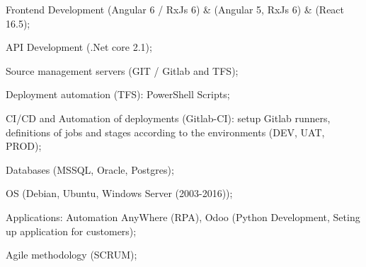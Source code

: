 \begin{cventries}
{      \begin{cvitems}
        \item {Frontend Development (Angular 6 / RxJs 6) \& (Angular 5, RxJs 6) \& (React 16.5);}
        \item {API Development (.Net core 2.1);}
        \item {Source management servers (GIT / Gitlab and TFS);}
        \item {Deployment automation (TFS): PowerShell Scripts;}
        \item {CI/CD and Automation of deployments (Gitlab-CI): setup Gitlab runners, definitions of jobs and stages according to the environments (DEV, UAT, PROD);}
        \item {Databases (MSSQL, Oracle, Postgres);}
        \item {OS (Debian, Ubuntu, Windows Server (2003-2016));}
        \item {Applications: Automation AnyWhere (RPA), Odoo (Python Development, Seting up application for customers);}
        \item {Agile methodology (SCRUM);}
      \end{cvitems}
    }


\end{cventries}
